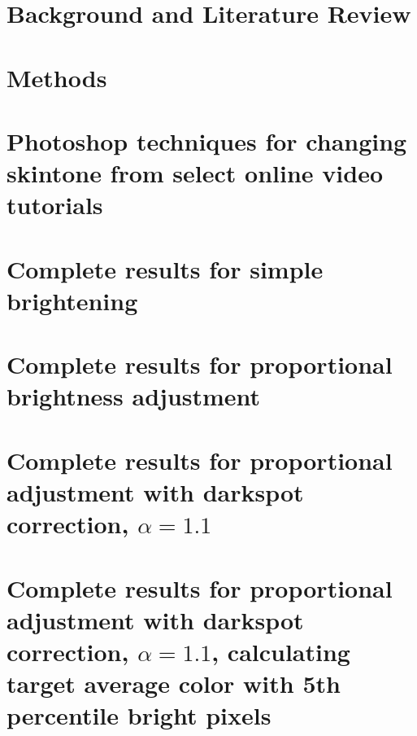 \documentclass[12pt, a4paper]{article}
\begin{document}
\tableofcontents
\pagebreak

\listoffigures
\listoftables
\pagebreak

\renewcommand{\nomname}{List of Symbols}
\printnomenclature
\pagebreak

\section{Background and Literature Review}

\pagebreak

\section{Methods}

\pagebreak



\pagebreak

\appendix

\section{Photoshop techniques for changing skintone from select online video tutorials}\label{app:photoshop}

\pagebreak

\section{Complete results for simple brightening}\label{app:boost}

\pagebreak

\section{Complete results for proportional brightness adjustment}\label{app:prop}

\pagebreak

\section{Complete results for proportional adjustment with darkspot correction, $\alpha = 1.1$}\label{app:prop_corr_a1p1}

\pagebreak

\section{Complete results for proportional adjustment with darkspot correction, $\alpha = 1.1$, calculating target average color with 5th percentile bright pixels}\label{app:prop_corr_ave_a1p1_perc5}

\end{document}
